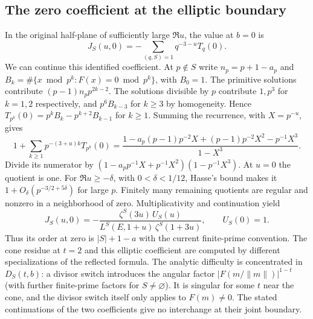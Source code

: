 \documentclass[11pt]{article}
\begin{document}
\subsection{The zero coefficient at the elliptic boundary}
In the original half-plane of sufficiently large $\Re u$, the value
at $b=0$ is
\[
 J_S(u,0)=-\sum_{(q,S)=1}q^{-3-u}T_q(0).
\]
We can continue this identified coefficient. At $p\notin S$ write
$n_p=p+1-a_p$ and $B_k=\#\{x\bmod p^k:F(x)=0\bmod p^k\}$, with
$B_0=1$. The primitive solutions contribute $(p-1)n_p p^{2k-2}$.
The solutions divisible by $p$ contribute $1,p^3$ for $k=1,2$
respectively, and $p^6 B_{k-3}$ for $k\ge3$ by homogeneity. Hence
$T_{p^k}(0)=p^k B_k-p^{k+2}B_{k-1}$ for $k\ge1$.
Summing the recurrence, with $X=p^{-u}$, gives
\[
 1+\sum_{k\ge1}p^{-(3+u)k}T_{p^k}(0)
 =\frac{1-a_p(p-1)p^{-2}X+(p-1)p^{-2}X^2-p^{-1}X^3}{1-X^3}.
\]
Divide its numerator by
$(1-a_p p^{-1}X+p^{-1}X^2)(1-p^{-1}X^3)$.
At $u=0$ the quotient is one. For $\Re u\ge-\delta$, with
$0<\delta<1/12$, Hasse's bound makes it
$1+O_\delta(p^{-3/2+5\delta})$ for large $p$. Finitely many remaining
quotients are regular and nonzero in a neighborhood of zero.
Multiplicativity and continuation yield
\begin{equation}\label{eq:deltaZ0}
 J_S(u,0)=-
 \frac{\zeta^S(3u)\,U_S(u)}
 {L^S(E,1+u)\,\zeta^S(1+3u)},\qquad U_S(0)=1 .
\end{equation}
Thus its order at zero is $|S|+1-a$ with the current finite-prime
convention. The cone residue at $t=2$ and this elliptic coefficient
are computed by different specializations of the reflected formula.
The analytic difficulty is concentrated in $D_S(t,b)$: a divisor
switch introduces the angular factor
$|F(m/\|m\|)|^{1-t}$ (with further finite-prime factors for $S\ne
\varnothing$). It is singular for some $t$ near the cone, and the
divisor switch itself only applies to $F(m)\ne0$. The stated
continuations of the two coefficients give no interchange at their
joint boundary.
\end{document}
